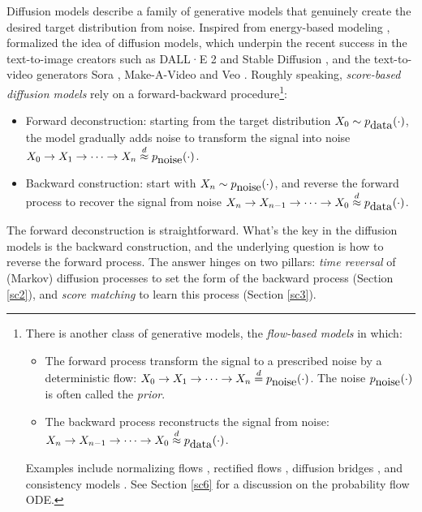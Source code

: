 \documentclass[letterpaper,11pt,reqno]{amsart}
\numberwithin{equation}{section}
\begin{document}
\quad Diffusion models 
describe a family of generative models 
that 
genuinely create 
the desired target distribution from noise.
Inspired from energy-based modeling \cite{Sohl15},
\cite{Ho20, Song19, Song20}
formalized
the idea of diffusion models,
which underpin the recent success
in the text-to-image creators 
such as
DALL·E 2 \cite{Ramesh22} and Stable Diffusion \cite{Rombach22},
and the text-to-video generators Sora \cite{Sora}, Make-A-Video \cite{Singer22} and Veo \cite{Veo}.
Roughly speaking,
{\em score-based diffusion models} rely on 
a forward-backward procedure\footnote{There is another class of generative models, the {\em flow-based models} in which:
\begin{itemize}[itemsep = 3 pt]
\item
The forward process transform the signal to a prescribed noise by a deterministic flow:
$X_0 \to X_1 \to \cdots \to X_n \stackrel{d}{=} p_{\tiny \mbox{noise}}(\cdot)$.
The noise $p_{\tiny \mbox{noise}}(\cdot)$ is often called the {\em prior}.
\item
The backward process reconstructs the signal from noise:  $X_n \to X_{n-1} \to \cdots \to X_0 \stackrel{d}{\approx} p_{\tiny \mbox{data}}(\cdot)$.
\end{itemize}

Examples include normalizing flows \cite{Lip23, PN21}, rectified flows \cite{Esser24, Liu22}, diffusion bridges \cite{DV21}, 
and consistency models \cite{song2023improved, SDC23}. 
See Section \ref{sc6} for a discussion on the probability flow ODE.}:

\begin{itemize}[itemsep = 3 pt]
\item
Forward deconstruction:
starting from the target distribution $X_0 \sim p_{\tiny \mbox{data}}(\cdot)$,
the model gradually adds noise
to transform the signal into noise 
$X_0 \to X_1 \to \cdots \to X_n \stackrel{d}{\approx} p_{\tiny \mbox{noise}}(\cdot)$.
\item
Backward construction:
 start with $X_n \sim p_{\tiny \mbox{noise}}(\cdot)$,
 and reverse the forward process 
 to recover the signal from noise
 $X_n \to X_{n-1} \to \cdots \to X_0 \stackrel{d}{\approx} p_{\tiny \mbox{data}}(\cdot)$.
\end{itemize}
The forward deconstruction is straightforward. 
What's the key in the diffusion models
is the backward construction,
and the underlying question is
how to reverse the forward process.
The answer hinges on two pillars:
{\em time reversal} of (Markov) diffusion processes to set the form of the backward process (Section \ref{sc2}),
and {\em score matching} to learn this process (Section \ref{sc3}).
\end{document}
